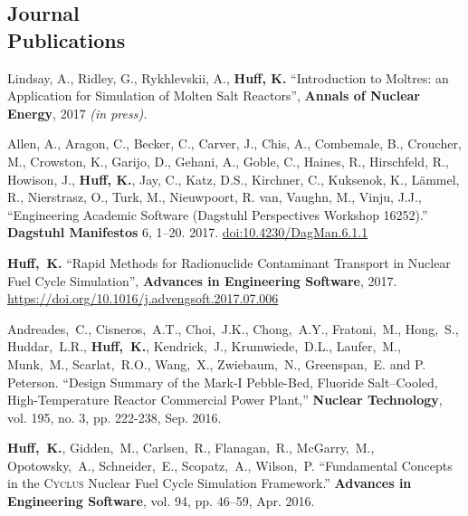 \documentclass[margin,line]{resume}
\newcommand{\Cyclus}{\textsc{Cyclus}\xspace}%
\begin{document}
\begin{resume}
    \section{\mysidestyle Journal\\Publications}
      \begin{bibenum}
       \item Lindsay, A., Ridley, G., Rykhlevskii, A., \textbf{Huff, K.} ``Introduction to 
               Moltres: an Application for Simulation of Molten Salt 
               Reactors'',  \textbf{Annals of Nuclear Energy}, 2017 \textsl{(in 
               press).}
      \item Allen, A., Aragon, C., Becker, C., Carver, J., Chis, A., Combemale, B., Croucher, M., Crowston, K., Garijo, D., Gehani, A., Goble, C., Haines, R., Hirschfeld, R., Howison, J., \textbf{Huff, K.}, Jay, C., Katz, D.S., Kirchner, C., Kuksenok, K., L\"{a}mmel, R., Nierstrasz, O., Turk, M., Nieuwpoort, R. van, Vaughn, M., Vinju, J.J., ``Engineering Academic Software (Dagstuhl Perspectives Workshop 16252).'' \textbf{Dagstuhl Manifestos} 6, 1–20. 2017. \url{doi:10.4230/DagMan.6.1.1}
       \item \textbf{Huff,~K.} ``Rapid Methods for Radionuclide Contaminant
       Transport in Nuclear Fuel Cycle Simulation'', \textbf{Advances in 
       Engineering Software}, 2017. \url{https://doi.org/10.1016/j.advengsoft.2017.07.006}
      \item Andreades,~C., Cisneros,~A.T., Choi,~J.K., Chong,~A.Y., 
              Fratoni,~M., Hong,~S., Huddar,~L.R., \textbf{Huff,~K.}, Kendrick,~J., 
              Krumwiede,~D.L., Laufer,~M., Munk,~M., Scarlat,~R.O., Wang,~X., 
              Zwiebaum,~N., Greenspan,~E. and P. Peterson.  ``Design Summary of 
              the Mark-I Pebble-Bed, Fluoride Salt–Cooled, High-Temperature 
              Reactor Commercial Power Plant,'' \textbf{Nuclear Technology}, vol. 195, 
              no. 3, pp. 222-238, Sep. 2016.
       \item \textbf{Huff,~K.}, Gidden,~M., Carlsen,~R., Flanagan,~R.,
       McGarry,~M., Opotowsky,~A., Schneider,~E.,
       Scopatz,~A., Wilson,~P.  ``Fundamental Concepts in the \Cyclus Nuclear Fuel Cycle
       Simulation Framework.'' \textbf{Advances in Engineering Software}, vol. 94, pp. 46–59, Apr. 2016.

\end{bibenum}
\end{resume}
\end{document}
